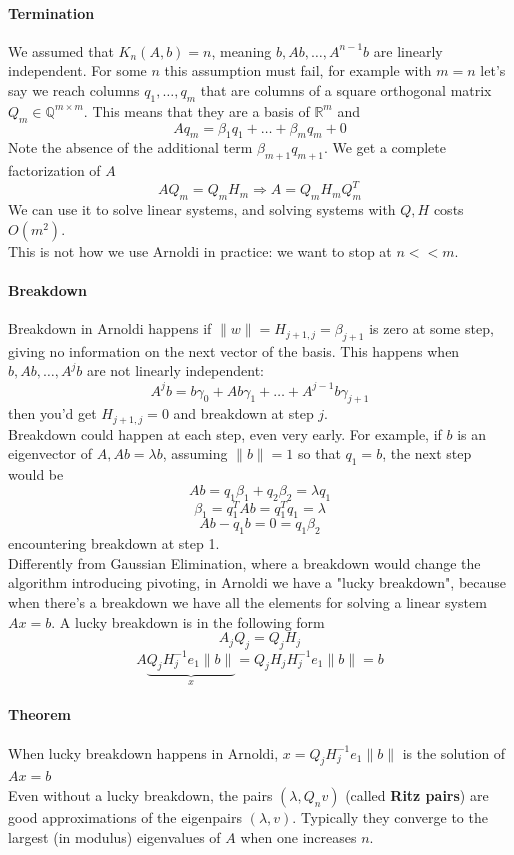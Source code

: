\documentclass[10pt]{report}
\begin{document}
\paragraph{Termination} We assumed that $K_n(A,b) = n$, meaning $b, Ab, \ldots, A^{n-1}b$ are linearly independent. For some $n$ this assumption must fail, for example with $m=n$ let's say we reach columns $q_1,\ldots,q_m$ that are columns of a square orthogonal matrix $Q_m\in\mathbb{Q}^{m\times m}$. This means that they are a basis of $\mathbb{R}^m$ and $$Aq_m = \beta_1q_1 + \ldots + \beta_mq_m + 0$$ Note the absence of the additional term $\beta_{m+1}q_{m+1}$. We get a complete factorization of $A$ $$AQ_m=Q_mH_m\Rightarrow A=Q_mH_mQ_m^T$$ We can use it to solve linear systems, and solving systems with $Q,H$ costs $O(m^2)$.\\
This is not how we use Arnoldi in practice: we want to stop at $n << m$.
\paragraph{Breakdown} Breakdown in Arnoldi happens if $\|w\|= H_{j+1,j} = \beta_{j+1}$ is zero at some step, giving no information on the next vector of the basis. This happens when $b,Ab,\ldots,A^jb$ are not linearly independent:
$$A^jb = b\gamma_0+Ab\gamma_1+\ldots+A^{j-1}b\gamma_{j+1}$$
then you'd get $H_{j+1,j}=0$ and breakdown at step $j$.\\
Breakdown could happen at each step, even very early. For example, if $b$ is an eigenvector of $A, Ab= \lambda b$, assuming $\|b\|=1$ so that $q_1=b$, the next step would be
$$Ab = q_1\beta_1+q_2\beta_2 = \lambda q_1$$
$$\beta_1 = q_1^TAb = q_1^T q_1 = \lambda$$
$$Ab-q_1b = 0 = q_1\beta_2$$
encountering breakdown at step 1.\\
Differently from Gaussian Elimination, where a breakdown would change the algorithm introducing pivoting, in Arnoldi we have a "lucky breakdown", because when there's a breakdown we have all the elements for solving a linear system $Ax=b$. A lucky breakdown is in the following form $$A_jQ_j = Q_jH_j$$
$$A\underset{x}{\underbrace{Q_jH_j^{-1}e_1\|b\|}} = Q_jH_jH_j^{-1}e_1\|b\|=b$$
\paragraph{Theorem} When lucky breakdown happens in Arnoldi, $x=Q_jH_j^{-1}e_1\|b\|$ is the solution of $Ax = b$\\
Even without a lucky breakdown, the pairs $(\lambda, Q_nv)$ (called \textbf{Ritz pairs}) are good approximations of the eigenpairs $(\lambda, v)$. Typically they converge to the largest (in modulus) eigenvalues of $A$ when one increases $n$.
\end{document}
